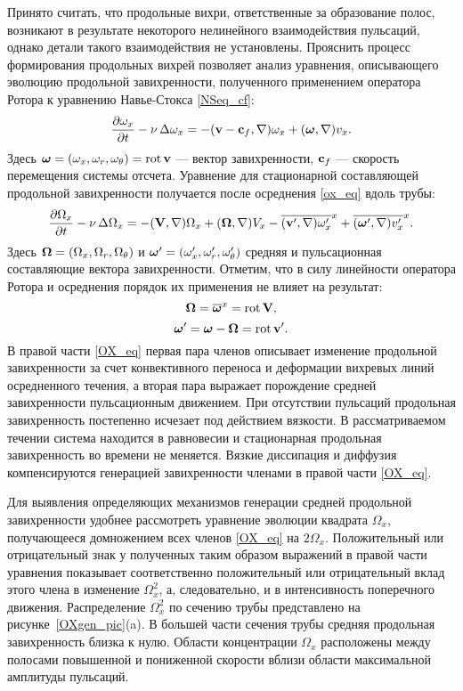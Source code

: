 Принято считать, что продольные вихри, ответственные за образование полос, возникают в результате некоторого нелинейного взаимодействия пульсаций, однако детали такого взаимодействия не установлены. Прояснить процесс формирования продольных вихрей позволяет анализ уравнения, описывающего эволюцию продольной завихренности, полученного применением оператора Ротора к уравнению Навье-Стокса \eqref{NSeq_cf}:
\begin{equation}\label{ox_eq}
\frac{\partial \omega_x}{\partial t} - \nu\mathop{}\!\Delta \omega_x =  -  (\mathbf{v} - \mathbf{c}_f, \nabla) \omega_x + (\mbox{\boldmath$\omega$}, \nabla) v_x.
\end{equation}
Здесь $\mbox{\boldmath$\omega$} = (\omega_x, \omega_r, \omega_\theta) = \mathop{}\!\operatorname{rot} \mathbf{v}$ --- вектор завихренности, $\mathbf{c}_f$ --- скорость перемещения системы отсчета. Уравнение для стационарной составляющей продольной завихренности получается после осреднения \eqref{ox_eq} вдоль трубы:
\begin{equation}\label{OX_eq}
\frac{\partial \Omega_x}{\partial t} - \nu\mathop{}\!\Delta \Omega_x = - (\mathbf{V}, \nabla) \Omega_x + (\mbox{\boldmath$\Omega$}, \nabla) V_x - \overline{(\mathbf{v}', \nabla) \omega'_x}^x + \overline{ (\mbox{\boldmath$\omega$}', \nabla) v'_x }^x.
\end{equation}
Здесь  $\mbox{\boldmath$\Omega$}=(\Omega_x, \Omega_r, \Omega_\theta)$ и $\mbox{\boldmath$\omega$}'=(\omega'_x, \omega'_r, \omega'_\theta)$ средняя и пульсационная составляющие вектора завихренности. Отметим, что в силу линейности оператора Ротора и осреднения порядок их применения не влияет на результат:
$$
\mbox{\boldmath$\Omega$} = \overline{\mbox{\boldmath$\omega$}}^x = \mathop{}\!\operatorname{rot} \mathbf{V},
$$ 
$$
\mbox{\boldmath$\omega$}' = \mbox{\boldmath$\omega$} - \mbox{\boldmath$\Omega$} = \mathop{}\!\operatorname{rot} \mathbf{v}'.
$$ 
В правой части \eqref{OX_eq} первая пара членов описывает изменение продольной завихренности за счет конвективного переноса и деформации вихревых линий осредненного течения, а вторая пара выражает порождение средней завихренности пульсационным движением. При отсутствии пульсаций продольная завихренность постепенно исчезает под действием вязкости. В рассматриваемом течении система находится в равновесии и стационарная продольная завихренность во времени не меняется. Вязкие диссипация и диффузия компенсируются генерацией завихренности членами в правой части \eqref{OX_eq}.

Для выявления определяющих механизмов генерации средней продольной завихренности удобнее рассмотреть уравнение эволюции квадрата $\Omega_x$, получающееся домножением всех членов \eqref{OX_eq} на $2\Omega_x$. Положительный или отрицательный знак у полученных таким образом выражений в правой части уравнения показывает соответственно положительный или отрицательный вклад этого члена в изменение $\Omega_x^2$, а, следовательно, и в интенсивность поперечного движения. Распределение $\Omega_x^2$ по сечению трубы представлено на рисунке~\ref{OXgen_pic}(a). В большей части сечения трубы средняя продольная завихренность близка к нулю. Области концентрации $\Omega_x$ расположены между полосами повышенной и пониженной скорости вблизи области максимальной амплитуды пульсаций.

